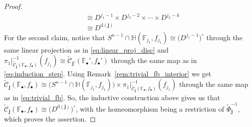 \begin{proof}
\begin{align*}
&\cong D^{j_1-1}\times D^{j_2-2}\times\cdots\times D^{j_k-k}\\
&\cong D^{\mathrm{d}(\mathbf{j})}
\end{align*}
For the second claim, notice that
$S^{n-1}\cap\mathbb{H}(\mathbb{F}_{j_1},f_{j_1})\cong\big(D^{j_1-1}\big)^{\circ}$
through the same linear projection as in \eqref{eq:linear_proj_disc} and
$\pi_1|_{\tilde{\mathcal{C}}_{\mathbf{j}}(\mathbb{F}_{\bullet},f_{\bullet})}^{-1}(f_{j_1})\cong\tilde{\mathcal{C}}_{\mathbf{j}'}(\mathbb{F}_{\bullet}',f_{\bullet}')$
through the same map as in \eqref{eq:induction_step}. Using Remark~\ref{rem:trivial_fb_interior} we get
$\tilde{\mathcal{C}}_{\mathbf{j}}(\mathbb{F}_{\bullet},f_{\bullet})\cong\big(S^{n-1}\cap\mathbb{H}(\mathbb{F}_{j_1},f_{j_1})\big)\times\pi_1|_{\tilde{\mathcal{C}}_{\mathbf{j}}(\mathbb{F}_{\bullet},f_{\bullet})}^{-1}(f_{j_1})$
through the same map as in \eqref{eq:trivial_fb}.
So, the inductive construction above gives us that
$\tilde{\mathcal{C}}_{\mathbf{j}}(\mathbb{F}_{\bullet},f_{\bullet})\cong\big(D^{\mathrm{d}(\mathbf{j})}\big)^{\circ}$,
with the homeomorphism being a restriction of $\tilde{\Phi}_{\mathbf{j}}^{-1}$, which proves the assertion.
\end{proof}


